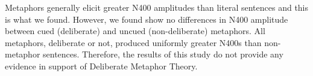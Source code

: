 \documentclass[]{article}
\begin{document}
	Metaphors generally elicit greater N400 amplitudes than literal sentences and this is what we found.
	However, we found show no differences in N400 amplitude between cued (deliberate) and uncued (non-deliberate) metaphors. 
	All metaphors, deliberate or not, produced uniformly greater N400s than non-metaphor sentences. Therefore, the results of this study do not provide any evidence in support of Deliberate Metaphor Theory. 
	
\printbibliography
\end{document}
